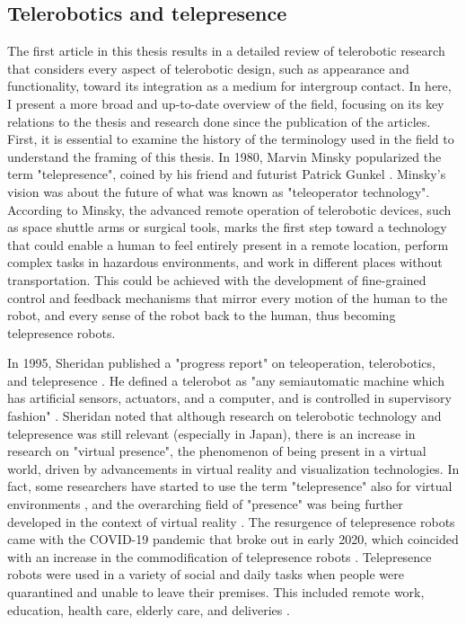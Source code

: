 \documentclass[dissertation,math,vertlayout,pdfa,colorlinks,nologo]{aaltoseries}
\begin{document}
\subsection{Telerobotics and telepresence}
The first article in this thesis results in a detailed review of telerobotic research that considers every aspect of telerobotic design, such as appearance and functionality, toward its integration as a medium for intergroup contact. In here, I present a more broad and up-to-date overview of the field, focusing on its key relations to the thesis and research done since the publication of the articles. First, it is essential to examine the history of the terminology used in the field to understand the framing of this thesis. In 1980, Marvin Minsky popularized the term "telepresence", coined by his friend and futurist Patrick Gunkel \cite{minskyTelepresence1980}. Minsky's vision was about the future of what was known as "teleoperator technology". According to Minsky, the advanced remote operation of telerobotic devices, such as space shuttle arms or surgical tools, marks the first step toward a technology that could enable a human to feel entirely present in a remote location, perform complex tasks in hazardous environments, and work in different places without transportation. This could be achieved with the development of fine-grained control and feedback mechanisms that mirror every motion of the human to the robot, and every sense of the robot back to the human, thus becoming telepresence robots.

In 1995, Sheridan published a "progress report" on teleoperation, telerobotics, and telepresence \cite{sheridanTeleoperationTeleroboticsTelepresence1995}. He defined a telerobot as "any semiautomatic machine which has artificial sensors, actuators, and a computer, and is controlled in supervisory fashion" \cite[p. 205]{sheridanTeleoperationTeleroboticsTelepresence1995}. Sheridan noted that although research on telerobotic technology and telepresence was still relevant (especially in Japan), there is an increase in research on "virtual presence", the phenomenon of being present in a virtual world, driven by advancements in virtual reality and visualization technologies. In fact, some researchers have started to use the term "telepresence" also for virtual environments \cite{steuerDefiningVirtualReality1992}, and the overarching field of "presence" was being further developed in the context of virtual reality \cite{slaterInfluenceBodyMovement1998}. The resurgence of telepresence robots came with the COVID-19 pandemic that broke out in early 2020, which coincided with an increase in the commodification of telepresence robots \cite{shenRobotsCOVID19Pandemic2021}. Telepresence robots were used in a variety of social and daily tasks when people were quarantined and unable to leave their premises. This included remote work, education, health care, elderly care, and deliveries \cite{shenRobotsCOVID19Pandemic2021}. 
\end{document}
